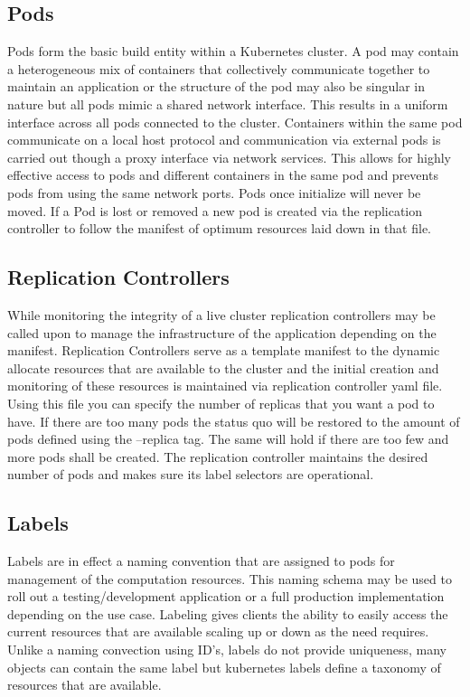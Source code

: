 \documentclass{article}
\begin{document}
\subsection{Pods}
Pods form the basic build entity within a Kubernetes cluster. A pod may contain a heterogeneous mix of containers that collectively communicate together to maintain an application or the structure of the pod may also be singular in nature but all pods mimic a shared network interface. This results in a uniform interface across all pods connected to the cluster. Containers within the same pod communicate on a local host protocol and communication via external pods is carried out though a proxy interface via network services. This allows for highly effective access to pods and different containers in the same pod and prevents pods from using the same network ports. Pods once initialize will never be moved. If a Pod is lost or removed a new pod is created via the replication controller to follow the manifest of optimum resources laid down in that file.
\subsection{Replication Controllers}
While monitoring the integrity of a live cluster replication controllers may be called upon to manage the infrastructure of the application depending on the manifest. Replication Controllers serve as a template manifest to the dynamic allocate resources that are available to the cluster and the initial creation and monitoring of these resources is maintained via replication controller yaml file.  Using this file you can specify the number of replicas that you want a pod to have. If there are too many pods the status quo will be restored to the amount of pods defined using the –replica tag. The same will hold if there are too few and more pods shall be created.  The replication controller maintains the desired number of pods and makes sure its label selectors are operational.
\subsection{Labels}
Labels are in effect a naming convention that are assigned to pods for management of the computation resources. This naming schema may be used to roll out a testing/development application or a full production implementation depending on the use case. Labeling gives clients the ability to easily access the current resources that are available scaling up or down as the need requires.
Unlike a naming convection using ID’s, labels do not provide uniqueness, many objects can contain the same label but kubernetes labels define a taxonomy of resources that are available.
\end{document}
